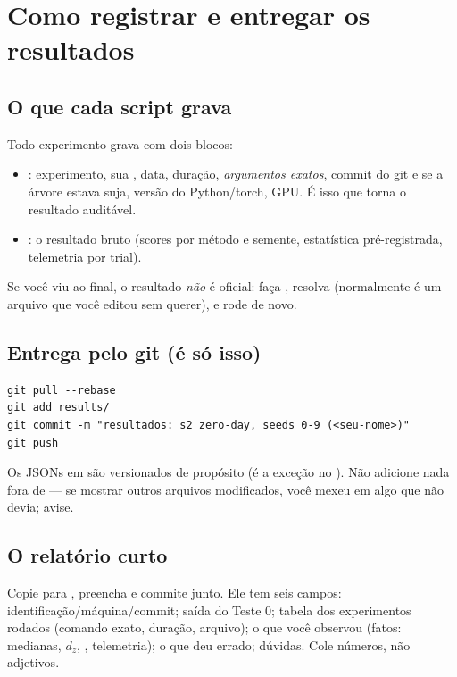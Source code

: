 \section{Como registrar e entregar os resultados}

\subsection{O que cada script grava}
Todo experimento grava  com dois blocos:
\begin{itemize}
\item {}: experimento, sua , data, duração, \emph{argumentos exatos}, commit do git e se a árvore estava suja, versão do Python/torch, GPU. É isso que torna o resultado auditável.
\item {}: o resultado bruto (scores por método e semente, estatística pré-registrada, telemetria por trial).
\end{itemize}
Se você viu  ao final, o resultado \emph{não} é oficial: faça , resolva (normalmente é um arquivo que você editou sem querer), e rode de novo.

\subsection{Entrega pelo git (é só isso)}
\begin{lstlisting}
git pull --rebase
git add results/
git commit -m "resultados: s2 zero-day, seeds 0-9 (<seu-nome>)"
git push
\end{lstlisting}
Os JSONs em  são versionados de propósito (é a exceção no ). Não adicione nada fora de  --- se  mostrar outros arquivos modificados, você mexeu em algo que não devia; avise.

\subsection{O relatório curto}
Copie  para , preencha e commite junto. Ele tem seis campos: identificação/máquina/commit; saída do Teste 0; tabela dos experimentos rodados (comando exato, duração, arquivo); o que você observou (fatos: medianas, $d_z$, , telemetria); o que deu errado; dúvidas. Cole números, não adjetivos.

